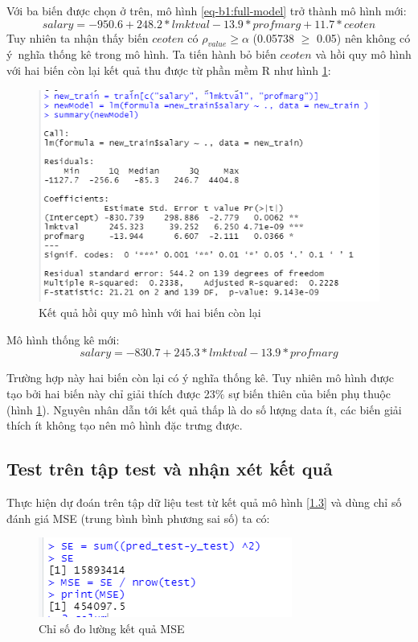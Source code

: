 Với ba biến được chọn ở trên, mô hình \ref{eq-b1:full-model} trở thành mô hình mới:
\begin{equation}\label{1.2}
\textit{salary} = -950.6 + 248.2 * \textit{lmktval} - 13.9 *\textit{profmarg} + 11.7  *\textit{ceoten}
\end{equation}
Tuy nhiên ta nhận thấy biến $\textit{ceoten}$ có $\rho_{value} \ge \alpha$ (0.05738 $\ge$ 0.05) nên không có ý~nghĩa thống kê trong mô hình. Ta tiến hành bỏ biến $\textit{ceoten}$ và hồi quy mô hình với hai biến còn lại kết quả thu được từ phần mềm R như hình \ref{fig-b1:new-summary}:

\begin{figure}[h!]
	\centering
	\includegraphics[width=.7\linewidth]{../Photo Of Result/B1_newsummary.PNG}  
	\caption{Kết quả hồi quy mô hình với hai biến còn lại}
	\label{fig-b1:new-summary}
\end{figure}

Mô hình thống kê mới:
\begin{equation}\label{1.3}
\textit{salary} = -830.7 + 245.3 *\textit{lmktval} -13.9 *\textit{profmarg}
\end{equation}

Trường hợp này hai biến còn lại có ý nghĩa thống kê. Tuy nhiên mô hình được tạo bởi hai biến này chỉ giải thích được 23$\%$ sự biến thiên của biến phụ thuộc (hình \ref{fig-b1:new-summary}). Nguyên nhân dẫn tới kết quả thấp là do số lượng data ít, các biến giải thích ít không tạo nên mô hình đặc trưng được.

\subsection*{Test trên tập test và nhận xét kết quả}

Thực hiện dự đoán trên tập dữ liệu test từ kết quả mô hình \ref{1.3} và dùng chỉ số đánh giá MSE (trung bình bình phương sai số) ta có:

\begin{figure}[h!]
	\centering
	\includegraphics[width=.5\linewidth]{../Photo Of Result/B1_MSE.PNG}  
	\caption{Chỉ số đo lường kết quả MSE}
	\label{fig-b1:mse}
\end{figure}










